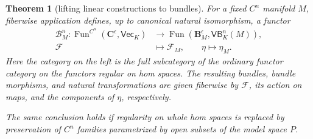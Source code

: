 \documentclass[11pt]{amsart}
\newtheorem{theorem}{Theorem}[section]
\theoremstyle{definition}
\theoremstyle{remark}
\numberwithin{equation}{section}
\begin{document}
\begin{theorem}[lifting linear constructions to bundles]\label{thm:bundle-lifting}
For a fixed $C^n$ manifold $M$, fiberwise application defines, up to canonical natural isomorphism, a functor
\[
\begin{aligned}
 \mathcal B_M^n\colon
 \operatorname{Fun}^{C^n}(\mathbf C^\epsilon,\mathsf{Vec}_K)
 &\longrightarrow
 \operatorname{Fun}(\mathbf B^\epsilon_M,\mathsf{VB}^n_K(M)),\\
 \mathcal F&\longmapsto\mathcal F_M,\qquad
 \eta\longmapsto\eta_M.
\end{aligned}
\]
Here the category on the left is the full subcategory of the ordinary functor category on the functors regular on hom spaces. The resulting bundles, bundle morphisms, and natural transformations are given fiberwise by $\mathcal F$, its action on maps, and the components of $\eta$, respectively.

The same conclusion holds if regularity on whole hom spaces is replaced by preservation of $C^n$ families parametrized by open subsets of the model space $P$.
\end{theorem}
\end{document}
